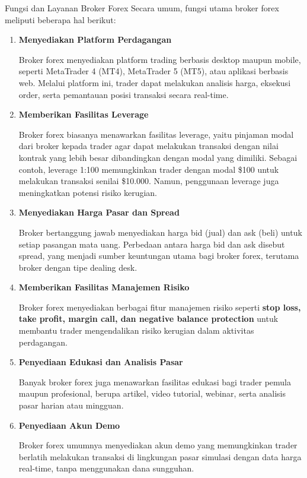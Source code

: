 Fungsi dan Layanan Broker Forex
Secara umum, fungsi utama broker forex meliputi beberapa hal berikut:
\begin{enumerate}
    \item \textbf{Menyediakan Platform Perdagangan}
    
    Broker forex menyediakan platform trading berbasis desktop maupun mobile, seperti MetaTrader 4 (MT4), MetaTrader 5 (MT5), atau aplikasi berbasis web. Melalui platform ini, trader dapat melakukan analisis harga, eksekusi order, serta pemantauan posisi transaksi secara real-time.
    
    \item \textbf{Memberikan Fasilitas Leverage}

    Broker forex biasanya menawarkan fasilitas leverage, yaitu pinjaman modal dari broker kepada trader agar dapat melakukan transaksi dengan nilai kontrak yang lebih besar dibandingkan dengan modal yang dimiliki. Sebagai contoh, leverage 1:100 memungkinkan trader dengan modal \$100 untuk melakukan transaksi senilai \$10.000. Namun, penggunaan leverage juga meningkatkan potensi risiko kerugian.

    \item \textbf{Menyediakan Harga Pasar dan Spread}

    Broker bertanggung jawab menyediakan harga bid (jual) dan ask (beli) untuk setiap pasangan mata uang. Perbedaan antara harga bid dan ask disebut spread, yang menjadi sumber keuntungan utama bagi broker forex, terutama broker dengan tipe dealing desk.

    \item \textbf{Memberikan Fasilitas Manajemen Risiko}

    Broker forex menyediakan berbagai fitur manajemen risiko seperti \textbf{stop loss, take profit, margin call, dan negative balance protection} untuk membantu trader mengendalikan risiko kerugian dalam aktivitas perdagangan.

    \item \textbf{Penyediaan Edukasi dan Analisis Pasar}

    Banyak broker forex juga menawarkan fasilitas edukasi bagi trader pemula maupun profesional, berupa artikel, video tutorial, webinar, serta analisis pasar harian atau mingguan.

    \item \textbf{Penyediaan Akun Demo}

    Broker forex umumnya menyediakan akun demo yang memungkinkan trader berlatih melakukan transaksi di lingkungan pasar simulasi dengan data harga real-time, tanpa menggunakan dana sungguhan.
\end{enumerate}

